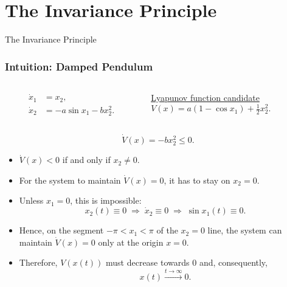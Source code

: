 \section{The Invariance Principle}

\begin{frame}
    The Invariance Principle


\end{frame}

\begingroup
\small


\begin{frame}
    \frametitle{Intuition: Damped Pendulum}

    \begin{columns}
        \begin{column}{0.5\textwidth}
            \begin{align*}
                \dot{x}_1 &= x_2, \\
                \dot{x}_2 &= -a \sin{x_1} - bx_2^2.
            \end{align*}
        \end{column}
        \begin{column}{0.5\textwidth}
            \underline{Lyapunov function candidate}\\[0.75ex]
            $ V(x) = a(1 - \cos{x_1}) + \frac{1}{2}x_2^2. $
        \end{column}
    \end{columns}
    \[ \dot{V}(x) = -bx_2^2 \leq 0. \]

    \begin{itemize}
        \item $\dot{V}(x) < 0$ if and only if $x_2 \neq 0$.
        \item For the system to maintain $\dot{V}(x) = 0$, it has to stay on
        $x_2=0$.
        \item Unless $x_1=0$, this is impossible:
        \[ x_2(t) \equiv 0 \; \Rightarrow \; \dot{x}_2 \equiv 0 \; \Rightarrow
        \; \sin{x_1(t)} \equiv 0. \]
        \item Hence, on the segment $-\pi < x_1 < \pi$ of the $x_2=0$ line, the
        system can maintain $\dot{V}(x) = 0$ only at the origin $x=0$.
        \item Therefore, $V(x(t))$ must decrease towards $0$ and, consequently, 
        \[ x(t) \xrightarrow{t \to \infty} 0. \]
    \end{itemize}
\end{frame}


